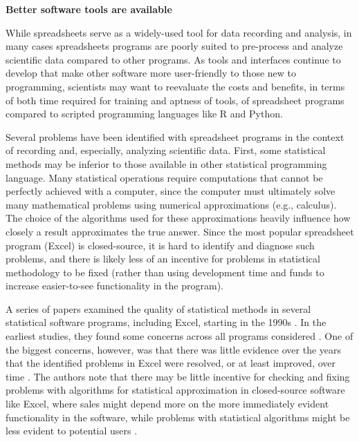 \documentclass[]{tufte-book}
\begin{document}
\textbf{Better software tools are available}

While spreadsheets serve as a widely-used tool for data recording and analysis,
in many cases spreadsheets programs are poorly suited to pre-process and analyze
scientific data compared to other programs. As tools and interfaces continue to
develop that make other software more user-friendly to those new to programming,
scientists may want to reevaluate the costs and benefits, in terms of both time
required for training and aptness of tools, of spreadsheet programs compared to
scripted programming languages like R and Python.

Several problems have been identified with spreadsheet programs in the context
of recording and, especially, analyzing scientific data. First, some statistical
methods may be inferior to those available in other statistical programming
language. Many statistical operations require computations that cannot be
perfectly achieved with a computer, since the computer must ultimately solve
many mathematical problems using numerical approximations (e.g., calculus). The
choice of the algorithms used for these approximations heavily influence how
closely a result approximates the true answer. Since the most popular
spreadsheet program (Excel) is closed-source, it is hard to identify and
diagnose such problems, and there is likely less of an incentive for problems in
statistical methodology to be fixed (rather than using development time and
funds to increase easier-to-see functionality in the program).

A series of papers examined the quality of statistical methods in several
statistical software programs, including Excel, starting in the 1990s
\citep{mccullough1999accuracy, mccullough1999assessing, mccullough2002accuracy, mccullough2005accuracy, mccullough2008accuracy, melard2014accuracy}. In the
earliest studies, they found some concerns across all programs considered
\citep{mccullough1999accuracy, mccullough1999assessing}. One of the biggest
concerns, however, was that there was little evidence over the years that the
identified problems in Excel were resolved, or at least improved, over time
\citep{mccullough2001does, mccullough2008accuracy}. The authors note that there may
be little incentive for checking and fixing problems with algorithms for
statistical approximation in closed-source software like Excel, where sales
might depend more on the more immediately evident functionality in the software,
while problems with statistical algorithms might be less evident to potential
users \citep{mccullough2001does}.
\end{document}
